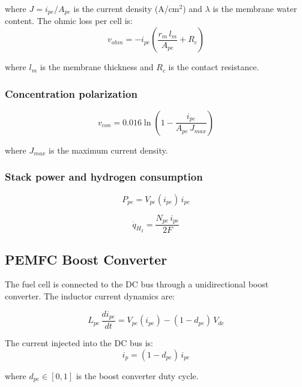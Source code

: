 \documentclass[journal]{IEEEtran}
\begin{document}
where $J = i_{pe}/A_{pe}$ is the current density (A/cm$^2$) and $\lambda$
is the membrane water content. The ohmic loss per cell is:
\begin{equation}
v_{ohm} = -i_{pe}\!\left(\frac{r_m\,l_m}{A_{pe}} + R_c\right)
\label{eq:fc_vohm}
\end{equation}

where $l_m$ is the membrane thickness and $R_c$ is the contact resistance.

\subsubsection*{Concentration polarization}
\begin{equation}
v_{con} = 0.016\ln\!\left(1 - \frac{i_{pe}}{A_{pe}\,J_{max}}\right)
\label{eq:fc_vcon}
\end{equation}

where $J_{max}$ is the maximum current density.

\subsubsection*{Stack power and hydrogen consumption}
\begin{equation}
P_{pe} = V_{pe}(i_{pe})\,i_{pe}
\label{eq:fc_power}
\end{equation}

\begin{equation}
\dot{q}_{H_2} = \frac{N_{pe}\,i_{pe}}{2F}
\label{eq:fc_qh2}
\end{equation}

\subsection{PEMFC Boost Converter}
\label{subsec:fc_conv}

The fuel cell is connected to the DC bus through a unidirectional boost
converter. The inductor current dynamics are:

\begin{equation}
L_{pe}\,\frac{di_{pe}}{dt} = V_{pe}(i_{pe}) - (1-d_{pe})\,V_{dc}
\label{eq:fc_conv}
\end{equation}

The current injected into the DC bus is:
\begin{equation}
i_p = (1-d_{pe})\,i_{pe}
\label{eq:fc_ip}
\end{equation}

where $d_{pe} \in [0,1]$ is the boost converter duty cycle.
\end{document}
